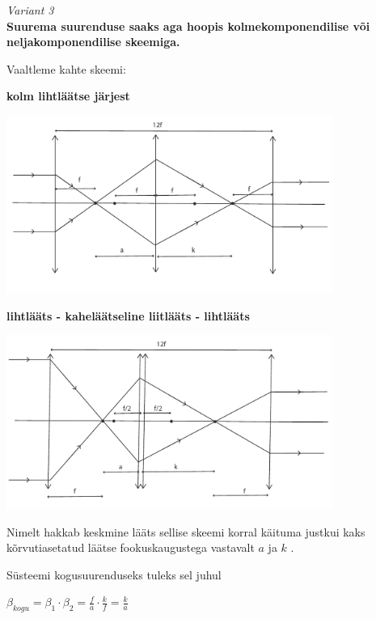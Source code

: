 \documentclass[10pt]{article}
\begin{document}
\emph{Variant 3}\\
\textbf{Suurema suurenduse saaks aga hoopis kolmekomponendilise  või neljakomponendilise skeemiga.}

Vaaltleme kahte skeemi:

\textbf{kolm lihtläätse järjest}

\vspace{-10pt}
  \begin{center}
    \includegraphics[width=0.8\textwidth]{2020-v2g-10-yl3.pdf}
  \end{center}
  \vspace{-10pt}

\textbf{lihtlääts - kaheläätseline liitlääts - lihtlääts}

\vspace{-10pt}
  \begin{center}
    \includegraphics[width=0.8\textwidth]{2020-v2g-10-yl4.pdf}
  \end{center}
  \vspace{-10pt}

Nimelt hakkab keskmine lääts sellise skeemi korral käituma justkui kaks kõrvutiasetatud läätse fookuskaugustega vastavalt $ a $ ja $ k $ .

Süsteemi kogusuurenduseks tuleks sel juhul

 $ {\beta}_{kogu} = {\beta}_1 \cdot {\beta}_2 = \frac {f} {a} \cdot \frac {k} {f} = \frac {k}{a}$
\end{document}
